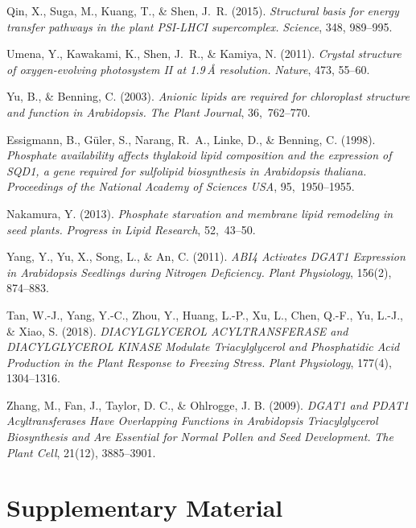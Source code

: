 \documentclass[10pt,letterpaper]{article}
\newcommand{\beginsupplement}{%
  \setcounter{table}{0}%
  \renewcommand{\thetable}{S\arabic{table}}%
  \setcounter{figure}{0}%
  \renewcommand{\thefigure}{S\arabic{figure}}}
\begin{document}
\begin{thebibliography}{10}
Qin, X., Suga, M., Kuang, T., \& Shen, J. R. (2015).  
\emph{Structural basis for energy transfer pathways in the plant PSI-LHCI supercomplex.}  
\textit{Science}, 348, 989–995.

Umena, Y., Kawakami, K., Shen, J. R., \& Kamiya, N. (2011).  
\emph{Crystal structure of oxygen-evolving photosystem II at 1.9 Å resolution.}  
\textit{Nature}, 473, 55–60.

Yu, B., \& Benning, C. (2003).  
\emph{Anionic lipids are required for chloroplast structure and function in Arabidopsis.}  
\textit{The Plant Journal}, 36, 762–770.

Essigmann, B., Güler, S., Narang, R. A., Linke, D., \& Benning, C. (1998).  
\emph{Phosphate availability affects thylakoid lipid composition and the expression of SQD1, a gene required for sulfolipid biosynthesis in Arabidopsis thaliana.}  
\textit{Proceedings of the National Academy of Sciences USA}, 95, 1950–1955.

Nakamura, Y. (2013).  
\emph{Phosphate starvation and membrane lipid remodeling in seed plants.}  
\textit{Progress in Lipid Research}, 52, 43–50.

Yang, Y., Yu, X., Song, L., \& An, C. (2011).  
\emph{ABI4 Activates DGAT1 Expression in Arabidopsis Seedlings during Nitrogen Deficiency.}  
\textit{Plant Physiology}, 156(2), 874–883.

Tan, W.-J., Yang, Y.-C., Zhou, Y., Huang, L.-P., Xu, L., Chen, Q.-F., Yu, L.-J., \& Xiao, S. (2018).  
\emph{DIACYLGLYCEROL ACYLTRANSFERASE and DIACYLGLYCEROL KINASE Modulate Triacylglycerol and Phosphatidic Acid Production in the Plant Response to Freezing Stress.}  
\textit{Plant Physiology}, 177(4), 1304–1316.

Zhang, M., Fan, J., Taylor, D. C., \& Ohlrogge, J. B. (2009).  
\emph{DGAT1 and PDAT1 Acyltransferases Have Overlapping Functions in Arabidopsis Triacylglycerol Biosynthesis and Are Essential for Normal Pollen and Seed Development.}  
\textit{The Plant Cell}, 21(12), 3885–3901.

\end{thebibliography}

\FloatBarrier
\section*{Supplementary Material}
\beginsupplement
\end{document}
